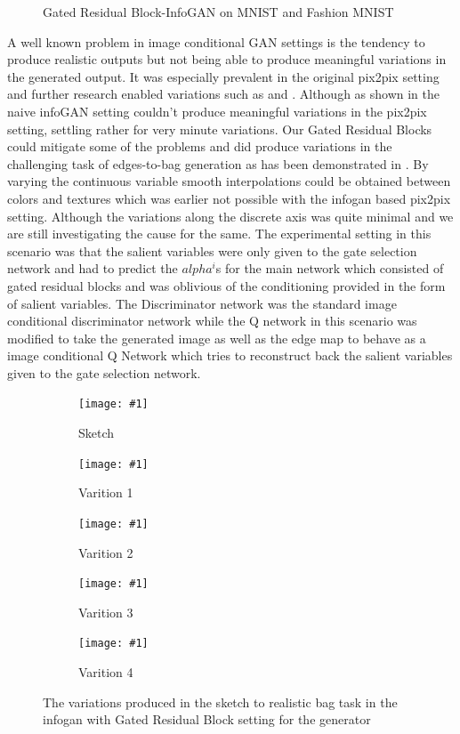 \begin{figure}%
    \centering
    \caption{Gated Residual Block-InfoGAN on MNIST and Fashion MNIST}
    \label{fig:infogan_unconditional}
    \vspace{-3mm}
\end{figure}

A well known problem in image conditional GAN settings is the tendency to produce realistic outputs but not being able to produce meaningful variations in the generated output. It was especially prevalent in the original pix2pix setting \cite{isola2016image2image} and further research enabled variations such as \cite{ghosh2017multi} and \cite{zhu2017toward}. Although as shown in \cite{ghosh2017multi} the naive infoGAN setting couldn't produce meaningful variations in the pix2pix setting, settling rather for very minute variations. Our Gated Residual Blocks could mitigate some of the problems and did produce variations in the challenging task of edges-to-bag generation as has been demonstrated in . By varying the continuous variable smooth interpolations could be obtained between colors and textures which was earlier not possible with the infogan based pix2pix setting. Although the variations along the discrete axis was quite minimal and we are still investigating the cause for the same. The experimental setting in this scenario was that the salient variables were only given to the gate selection network and had to predict the $alpha^i$s for the main network which consisted of gated residual blocks and was oblivious of the conditioning provided in the form of salient variables. The Discriminator network was the standard image conditional discriminator network while the Q network in this scenario was modified to take the generated image as well as the edge map to behave as a image conditional Q Network which tries to reconstruct back the salient variables given to the gate selection network. 

\newcommand{\addSubFigEighth}[3]{\begin{subfigure}[t]{.18\linewidth}
   \texttt{[image: \#1]}
   \caption{#2}\label{#3}\end{subfigure}
}
\begin{figure}%
    \centering
    \addSubFigEighth{Picture8}{Sketch}{fig:bag_sketch} 
    \addSubFigEighth{Picture9}{Varition 1}{fig:bag_1} 
    \addSubFigEighth{Picture10}{Varition 2}{fig:bag_2}
    \addSubFigEighth{Picture11}{Varition 3}{fig:bag_3}
    \addSubFigEighth{Picture12}{Varition 4}{fig:bag_4}
    \caption{The variations produced in the sketch to realistic bag task in the infogan with Gated Residual Block setting for the generator }
    \label{fig:infogan_bags}
    \vspace{-3mm}
\end{figure}

